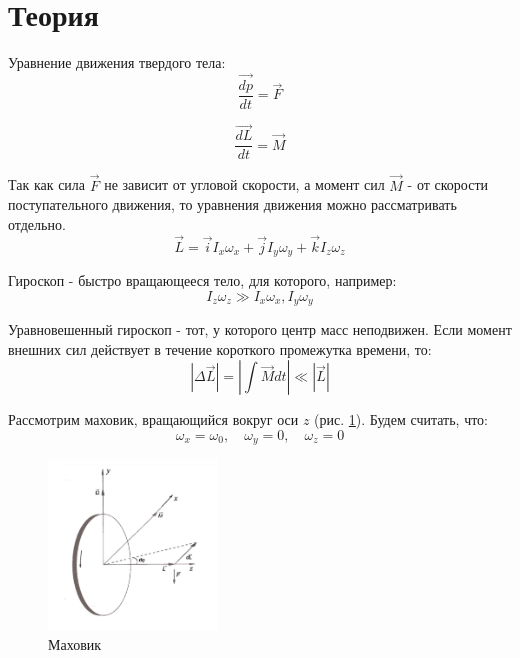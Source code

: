 \section{Теория}
Уравнение движения твердого тела:
    \begin{equation}
        \frac{\overrightarrow{dp}}{dt}=\overrightarrow{F}
    \end{equation}
    
    \begin{equation}
        \frac{\overrightarrow{dL}}{dt}=\overrightarrow{M}
    \end{equation}
    
    Так как сила $\overrightarrow{F}$ не зависит от угловой скорости, а момент сил $\overrightarrow{M}$ - от скорости поступательного движения, то уравнения движения можно рассматривать отдельно.
    \begin{equation}
        \overrightarrow{L}=\overrightarrow{i}I_x\omega_x+\overrightarrow{j}I_y\omega_y+\overrightarrow{k}I_z\omega_z
    \end{equation}
    
    Гироскоп  - быстро вращающееся тело, для которого, например:
    \begin{equation}
        I_z\omega_z\gg I_x\omega_x, I_y\omega_y
    \end{equation}
    
    Уравновешенный гироскоп - тот, у которого центр масс неподвижен.
    Если момент внешних сил действует в течение короткого промежутка времени, то:
    \begin{equation}
        \left|\Delta \overrightarrow{L}\right|=\left|\int \overrightarrow{M}dt\right|\ll \left|\overrightarrow{L}\right|
    \end{equation}
    
    Рассмотрим маховик, вращающийся вокруг оси $z$ (рис. \ref{маховик}). Будем считать, что:
    \begin{equation}
        \omega_x=\omega_0,\quad		\omega_y=0, \quad	\omega_z=0
    \end{equation}
    
    \begin{figure}[h!]
        \begin{center}
        \includegraphics[width=0.4\textwidth]{./images/1.png}
        \end{center}
        \caption{Маховик} \label{маховик}
    \end{figure}
    
